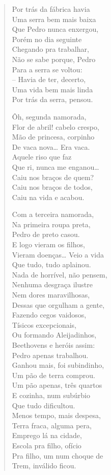 \begin{verse}
Por trás da fábrica havia\\
Uma serra bem mais baixa\\
Que Pedro nunca enxergou,\\
Porém no dia seguinte\\
Chegando pra trabalhar,\\
Não se sabe porque, Pedro\\
Para a serra se voltou:\\
-- Havia de ter, decerto,\\
Uma vida bem mais linda\\
Por trás da serra, pensou.

Ôh, segunda namorada,\\
Flor de abril! cabelo crespo,\\
Mão de princesa, corpinho\\
De vaca nova\ldots{} Era vaca.\\
Aquele riso que faz\\
Que ri, nunca me enganou\ldots{}\\
Caiu nos braços de quem?\\
Caiu nos braços de todos,\\
Caiu na vida e acabou.

Com a terceira namorada,\\
Na primeira roupa preta,\\
Pedro de preto casou.\\
E logo vieram os filhos,\\
Vieram doenças\ldots{} Veio a vida\\
Que tudo, tudo aplainou.\\
Nada de horrível, não pensem,\\
Nenhuma desgraça ilustre\\
Nem dores maravilhosas,\\
Dessas que orgulham a gente,\\
Fazendo cegos vaidosos,\\
Tísicos excepcionais,\\
Ou formando Aleijadinhos,\\
Beethovens e heróis assim:\\
Pedro apenas trabalhou.\\
Ganhou mais, foi subindinho,\\
Um pão de terra comprou.\\
Um pão apenas, três quartos\\
E cozinha, num subúrbio\\
Que tudo dificultou.\\
Menos tempo, mais despesa,\\
Terra fraca, alguma pera,\\
Emprego lá na cidade,\\
Escola pra filho, ofício\\
Pra filho, um num choque de\\
Trem, inválido ficou.


\end{verse}
